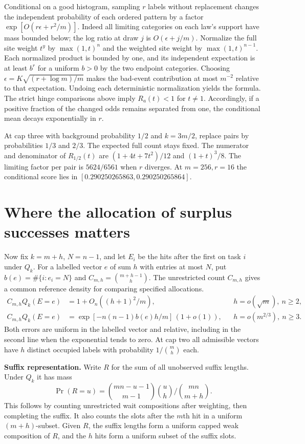 Conditional on a good histogram, sampling $r$ labels without replacement changes the independent probability of each ordered pattern by a factor $\exp[O(r\epsilon+r^2/m)]$. Indeed all limiting categories on each law's support have mass bounded below; the log ratio at draw $j$ is $O(\epsilon+j/m)$. Normalize the full site weight $t^y$ by $\max(1,t)^n$ and the weighted site weight by $\max(1,t)^{n-1}$. Each normalized product is bounded by one, and its independent expectation is at least $b^r$ for a uniform $b>0$ by the two endpoint categories. Choosing $\epsilon=K\sqrt{(r+\log m)/m}$ makes the bad-event contribution at most $m^{-2}$ relative to that expectation. Undoing each deterministic normalization yields the formula. The strict hinge comparisons above imply $R_a(t)<1$ for $t\ne1$. Accordingly, if a positive fraction of the changed odds remains separated from one, the conditional mean decays exponentially in $r$.

At cap three with background probability $1/2$ and $k=3m/2$, replace pairs by probabilities $1/3$ and $2/3$. The expected full count stays fixed. The numerator and denominator of $R_{1/2}(t)$ are $(1+4t+7t^2)/12$ and $(1+t)^3/8$. The limiting factor per pair is $5624/6561$ when $r$ diverges. At $m=256,r=16$ the conditional score lies in $[0.290250265863,0.290250265864]$.

\section*{Where the allocation of surplus successes matters}
Now fix $k=m+h$, $N=n-1$, and let $E_i$ be the hits after the first on task $i$ under $Q_k$. For a labelled vector $e$ of sum $h$ with entries at most $N$, put $b(e)=\#\{i:e_i=N\}$ and $C_{m,h}=\binom{m+h-1}{h}$. The unrestricted count $C_{m,h}$ gives a common reference density for comparing specified allocations.
\[
\begin{aligned}
 C_{m,h}Q_k(E=e)&=1+O_n((h+1)^2/m), &&h=o(\sqrt m),\ n\ge2,\\
 C_{m,h}Q_k(E=e)&=\exp[-n(n-1)b(e)h/m]\,(1+o(1)),
       &&h=o(m^{2/3}),\ n\ge3 .
\end{aligned}
\]
Both errors are uniform in the labelled vector and relative, including in the second line when the exponential tends to zero. At cap two all admissible vectors have $h$ distinct occupied labels with probability $1/\binom mh$ each.

\textbf{Suffix representation.} Write $R$ for the sum of all unobserved suffix lengths. Under $Q_k$ it has mass
\[
 \Pr(R=u)=\binom{mn-u-1}{m-1}\binom uh\Big/\binom{mn}{m+h}.
\]
This follows by counting unrestricted wait compositions after weighting, then completing the suffix. It also counts the slots after the $m$th hit in a uniform $(m+h)$-subset. Given $R$, the suffix lengths form a uniform capped weak composition of $R$, and the $h$ hits form a uniform subset of the suffix slots.

